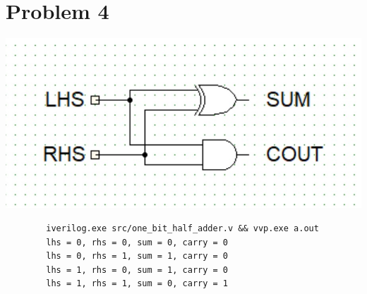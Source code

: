 \documentclass{article}
\newenvironment{problem}[1]{
  \nobreak\section*{Problem #1}
}{}
\begin{document}
\begin{problem}{4}
    \begin{center}
      
    \end{center}

    \begin{center}
      \includegraphics{images/one_bit_half_adder.jpg}
    \end{center}

    \begin{center}
      \begin{lstlisting}
        iverilog.exe src/one_bit_half_adder.v && vvp.exe a.out
        lhs = 0, rhs = 0, sum = 0, carry = 0
        lhs = 0, rhs = 1, sum = 1, carry = 0
        lhs = 1, rhs = 0, sum = 1, carry = 0
        lhs = 1, rhs = 1, sum = 0, carry = 1
      \end{lstlisting}
    \end{center}
  \end{problem}
\end{document}
